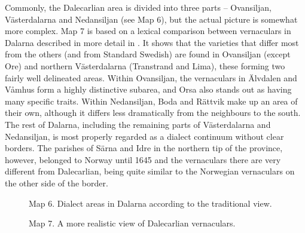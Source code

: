Commonly, the Dalecarlian area is divided into three parts – Ovansiljan, Västerdalarna and Nedansiljan (see Map 6), but the actual picture is somewhat more complex. Map 7 is based on a lexical comparison between vernaculars in Dalarna described in more detail in \citet{Dahl2005}. It shows that the varieties that differ most from the others (and from Standard Swedish) are found in Ovansiljan (except Ore) and northern Västerdalarna (Transtrand and Lima), these forming two fairly well delineated areas. Within Ovansiljan, the vernaculars in Älvdalen and Våmhus form a highly distinctive subarea, and Orsa also stands out as having many specific traits. Within Nedansiljan, Boda and Rättvik make up an area of their own, although it differs less dramatically from the neighbours to the south. The rest of Dalarna, including the remaining parts of Västerdalarna and Nedansiljan, is most properly regarded as a dialect continuum without clear borders. The parishes of Särna and Idre in the northern tip of the province, however, belonged to Norway until 1645 and the vernaculars there are very different from Dalecarlian, being quite similar to the Norwegian vernaculars on the other side of the border. 




\begin{figure}[h]



\label{bkm:Ref216765084}Map 6. Dialect areas in Dalarna according to the traditional view.




\end{figure}



\begin{figure}[h]



\label{bkm:Ref216765095}Map 7. A more realistic view of Dalecarlian vernaculars.




\end{figure}

